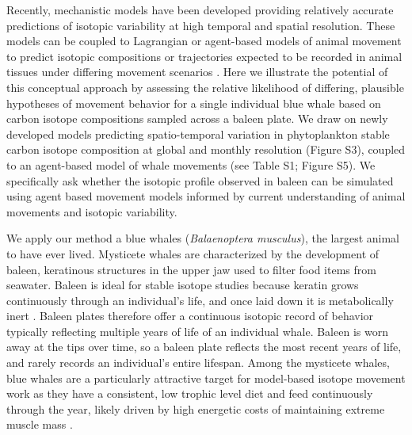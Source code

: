 \documentclass[a4paper,12pt]{article}
\begin{document}
Recently, mechanistic models have been developed providing relatively accurate predictions of isotopic variability at high temporal and spatial resolution. 
These models can be coupled to Lagrangian or agent-based models of animal movement to predict isotopic compositions or trajectories expected to be recorded in animal tissues under differing movement scenarios \citep{carpenter2019}. 
Here we illustrate the potential of this conceptual approach by assessing the relative likelihood of differing, plausible hypotheses of movement behavior for a single individual blue whale based on carbon isotope compositions sampled across a baleen plate.  
We draw on newly developed models predicting spatio-temporal variation in phytoplankton stable carbon isotope composition at global and monthly resolution \citep{magozzi2017using} (Figure S3), coupled to an agent-based model of whale movements (see Table S1; Figure S5). 
We specifically ask whether the isotopic profile observed in baleen can be simulated using agent based movement models informed by current understanding of animal movements and isotopic variability.

We apply our method a blue whales (\textit{Balaenoptera musculus}), the largest animal to have ever lived. 
Mysticete whales are characterized by the development of baleen, keratinous structures in the upper jaw used to filter food items from seawater. 
Baleen is ideal for stable isotope studies because keratin grows continuously through an individual's life, and once laid down it is metabolically inert \citep{best1996stable,hobson1998stable}. 
Baleen plates therefore offer a continuous isotopic record of behavior typically reflecting multiple years of life of an individual whale. 
Baleen is worn away at the tips over time, so a baleen plate reflects the most recent years of life, and rarely records an individual's entire lifespan. 
Among the mysticete whales, blue whales are a particularly attractive target for model-based isotope movement work as they have a consistent, low trophic level diet and feed continuously through the year, likely driven by high energetic costs of maintaining extreme muscle mass \citep{goldbogen2015}.
\end{document}
